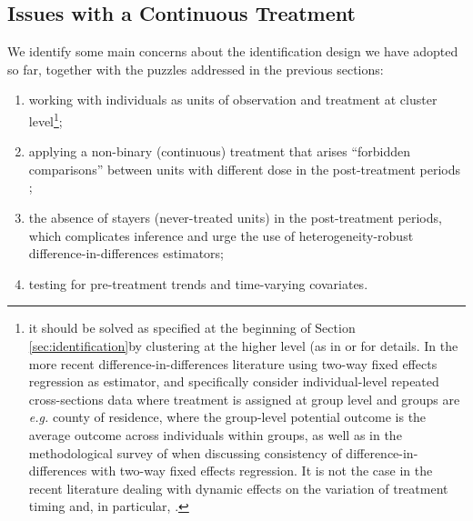 \documentclass[11pt]{article}
\begin{document}

\subsection{Issues with a Continuous Treatment}\label{sec:estimators}

We identify some main concerns about the identification design we have adopted so far, together with the puzzles addressed in the previous sections:

\begin{enumerate}
    \item working with individuals as units of observation and treatment at cluster level\footnote{it should be solved as specified at the beginning of Section \ref{sec:identification}by clustering at the higher level (as in \citet{bib:bertrand2004} or \citet{bib:cameron2015} for details. In the more recent difference-in-differences literature using two-way fixed effects regression as estimator, \citet{bib:dechaisemartin2020,bib:dechaisemartin2020b} and \citet{bib:dechaisemartin2022b} specifically consider individual-level repeated cross-sections data where treatment is assigned at group level and groups are \textit{e.g.} county of residence, where the group-level potential outcome is the average outcome across individuals within groups, as well as in the methodological survey of \citet{bib:roth2022} when discussing consistency of difference-in-differences with two-way fixed effects regression. It is not the case in the recent literature dealing with dynamic effects on the variation of treatment timing \citep[][among others]{bib:callaway2021a,bib:sun2021,bib:borusyak2021} and, in particular, \citet{bib:callaway2021}.};
    \item applying a non-binary (continuous) treatment that arises ``forbidden comparisons'' between units with different dose in the post-treatment periods \citep{bib:borusyak2021};
    \item the absence of stayers (never-treated units) in the post-treatment periods, which complicates inference and urge the use of heterogeneity-robust difference-in-differences estimators;
    \item testing for pre-treatment trends and time-varying covariates.
\end{enumerate}

\end{document}
